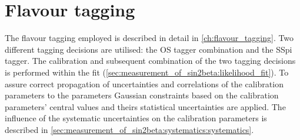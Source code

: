 
\section{Flavour tagging}
\label{sec:measurement_of_sin2beta:flavour_tagging}

The flavour tagging employed is described in detail in
\cref{ch:flavour_tagging}. Two different tagging decisions are utilised: the
\acf{OS} tagger combination and the \acf{SSpi} tagger. The calibration and
subsequent combination of the two tagging decisions is performed within the fit
(\cf \cref{sec:measurement_of_sin2beta:likelihood_fit}). To assure correct
propagation of uncertainties and correlations of the calibration parameters to
the \CP parameters Gaussian constraints based on the calibration parameters'
central values and theirs statistical uncertainties are applied. The influence
of the systematic uncertainties on the calibration parameters is described in
\cref{sec:measurement_of_sin2beta:systematics:systematics}.
